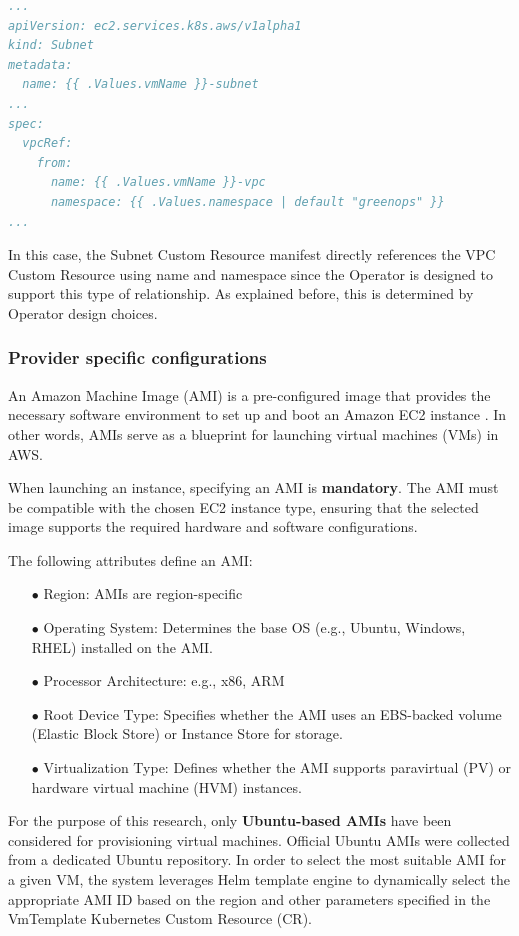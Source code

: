 \begin{lstlisting}[language=yaml, caption={AWS Operator direct reference example}, label={lst:aws_direct_reference}]
...
apiVersion: ec2.services.k8s.aws/v1alpha1
kind: Subnet
metadata:
  name: {{ .Values.vmName }}-subnet
...
spec:
  vpcRef: 
    from: 
      name: {{ .Values.vmName }}-vpc
      namespace: {{ .Values.namespace | default "greenops" }}
...
\end{lstlisting}

In this case, the Subnet Custom Resource manifest directly references the VPC Custom Resource using name and namespace since the Operator is designed to support this type of relationship. As explained before, this is determined by Operator design choices.


\subsubsection{Provider specific configurations}

An Amazon Machine Image (AMI) is a pre-configured image that provides the necessary software environment to set up and boot an Amazon EC2 instance \cite{aws_AMIs}. In other words, AMIs serve as a blueprint for launching virtual machines (VMs) in AWS.

When launching an instance, specifying an AMI is \textbf{mandatory}. The AMI must be compatible with the chosen EC2 instance type, ensuring that the selected image supports the required hardware and software configurations.

The following attributes define an AMI:
\begin{itemize}[itemsep=0.2pt, topsep=1pt] 
  \item[$\bullet$] Region: AMIs are region-specific
  \item[$\bullet$] Operating System: Determines the base OS (e.g., Ubuntu, Windows, RHEL) installed on the AMI.
  \item[$\bullet$] Processor Architecture: e.g., x86, ARM
  \item[$\bullet$] Root Device Type: Specifies whether the AMI uses an EBS-backed volume (Elastic Block Store) or Instance Store for storage.
  \item[$\bullet$] Virtualization Type: Defines whether the AMI supports paravirtual (PV) or hardware virtual machine (HVM) instances.
\end{itemize}


For the purpose of this research, only \textbf{Ubuntu-based AMIs} have been considered for provisioning virtual machines. Official Ubuntu AMIs were collected from a dedicated Ubuntu repository.
In order to select the most suitable AMI for a given VM, the system leverages Helm template engine to dynamically select the appropriate AMI ID based on the region and other parameters specified in the VmTemplate Kubernetes Custom Resource (CR).



